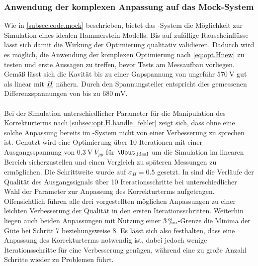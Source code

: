 \documentclass[../Report.tex]{subfiles}
\begin{document}
\subsubsection{Anwendung der komplexen Anpassung auf das Mock-System}
\label{subsubsec:opt.H.mock_simulation}

Wie in \ref{subsec:code.mock} beschrieben, bietet das \mock-System die Möglichkeit zur Simulation eines idealen Hammerstein-Modells. Bis auf zufällige Rauscheinflüsse lässt sich damit die Wirkung der Optimierung qualitativ validieren.
Dadurch wird es möglich, die Anwendung der komplexen Optimierung nach \eqref{eq:opt.Hnew} zu testen und erste Aussagen zu treffen, bevor Tests am Messaufbau vorliegen.
Gemäß \cite{gross17} lässt sich die Kavität bis zu einer Gapspannung von ungefähr $\SI{570}{\volt}$ gut als linear mit $\underline{H}$ nähern. Durch den Spannungsteiler entspricht dies gemessenen Differenzspannungen von bis zu $\SI{680}{\milli\volt}$.
\\
\\
Bei der Simulation unterschiedlicher Parameter für die Manipulation des Korrekturterms nach \ref{subsec:opt.H.handle_fehler} zeigt sich, dass ohne eine solche Anpassung bereits im \mock-System nicht von einer Verbesserung zu sprechen ist.
Genutzt wird eine Optimierung über 10 Iterationen mit einer Ausgangsspannung von $\SI{0.3}{\volt} ~ V_{pp}$ für $\Uout_{, \mathrm{ideal}}$ um die Simulation im linearen Bereich sicherzustellen und einen Vergleich zu späteren Messungen zu ermöglichen. Die Schrittweite wurde auf $\sigma_H = 0.5$ gesetzt.
In  sind die Verläufe der Qualität des Ausgangssignals über 10 Iterationsschritte bei unterschiedlicher Wahl der Parameter zur Anpassung des Korrekturterms aufgetragen. Offensichtlich führen alle drei vorgestellten möglichen Anpassungen zu einer leichten Verbesserung der Qualität in den ersten Iterationsschritten. Weiterhin liegen auch beiden Anpassungen mit Nutzung einer $3 \, {}^\text{o}\mkern-5mu/\mkern-3mu_\text{oo}$-Grenze die Minima der Güte bei Schritt 7 beziehungsweise 8. 
Es lässt sich also festhalten, dass eine Anpassung des Korrekturterms notwendig ist, dabei jedoch wenige Iterationsschritte für eine Verbesserung genügen, während eine zu große Anzahl Schritte wieder zu Problemen führt. 

 \qualitySimple
{} \qualityThreePerm
{} \qualityAll
{} \qualityRMS
{} \qualityZeroPad
\end{document}
